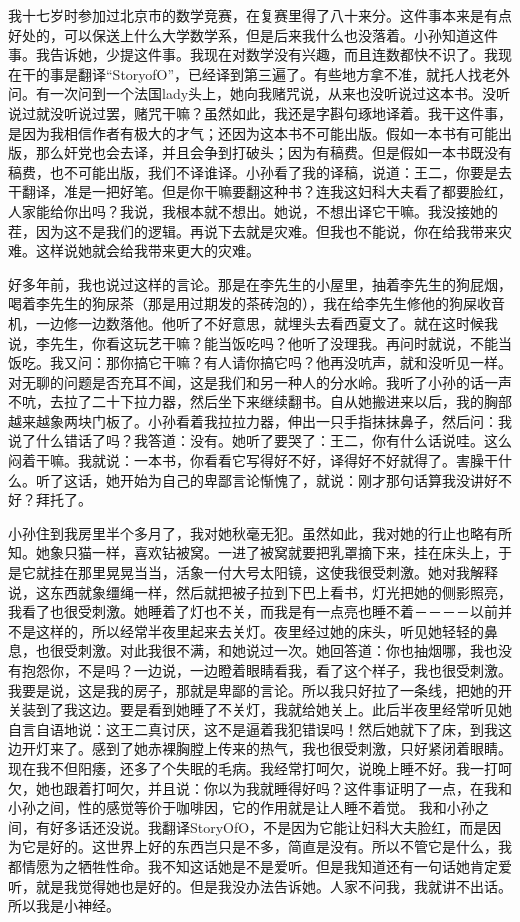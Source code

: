 我十七岁时参加过北京市的数学竞赛，在复赛里得了八十来分。这件事本来是有点好处的，可以保送上什么大学数学系，但是后来我什么也没落着。小孙知道这件事。我告诉她，少提这件事。我现在对数学没有兴趣，而且连数都快不识了。我现在干的事是翻译“StoryofO”，已经译到第三遍了。有些地方拿不准，就托人找老外问。有一次问到一个法国lady头上，她向我赌咒说，从来也没听说过这本书。没听说过就没听说过罢，赌咒干嘛？虽然如此，我还是字斟句琢地译着。我干这件事，是因为我相信作者有极大的才气；还因为这本书不可能出版。假如一本书有可能出版，那么奸党也会去译，并且会争到打破头；因为有稿费。但是假如一本书既没有稿费，也不可能出版，我们不译谁译。小孙看了我的译稿，说道：王二，你要是去干翻译，准是一把好笔。但是你干嘛要翻这种书？连我这妇科大夫看了都要脸红，人家能给你出吗？我说，我根本就不想出。她说，不想出译它干嘛。我没接她的茬，因为这不是我们的逻辑。再说下去就是灾难。但我也不能说，你在给我带来灾难。这样说她就会给我带来更大的灾难。 

好多年前，我也说过这样的言论。那是在李先生的小屋里，抽着李先生的狗屁烟，喝着李先生的狗尿茶（那是用过期发的茶砖泡的），我在给李先生修他的狗屎收音机，一边修一边数落他。他听了不好意思，就埋头去看西夏文了。就在这时候我说，李先生，你看这玩艺干嘛？能当饭吃吗？他听了没理我。再问时就说，不能当饭吃。我又问：那你搞它干嘛？有人请你搞它吗？他再没吭声，就和没听见一样。对无聊的问题是否充耳不闻，这是我们和另一种人的分水岭。我听了小孙的话一声不吭，去拉了二十下拉力器，然后坐下来继续翻书。自从她搬进来以后，我的胸部越来越象两块门板了。小孙看着我拉拉力器，伸出一只手指抹抹鼻子，然后问：我说了什么错话了吗？我答道：没有。她听了要哭了：王二，你有什么话说哇。这么闷着干嘛。我就说：一本书，你看看它写得好不好，译得好不好就得了。害臊干什么。听了这话，她开始为自己的卑鄙言论惭愧了，就说：刚才那句话算我没讲好不好？拜托了。 

小孙住到我房里半个多月了，我对她秋毫无犯。虽然如此，我对她的行止也略有所知。她象只猫一样，喜欢钻被窝。一进了被窝就要把乳罩摘下来，挂在床头上，于是它就挂在那里晃晃当当，活象一付大号太阳镜，这使我很受刺激。她对我解释说，这东西就象缰绳一样，然后就把被子拉到下巴上看书，灯光把她的侧影照亮，我看了也很受刺激。她睡着了灯也不关，而我是有一点亮也睡不着－－－－以前并不是这样的，所以经常半夜里起来去关灯。夜里经过她的床头，听见她轻轻的鼻息，也很受刺激。对此我很不满，和她说过一次。她回答道：你也抽烟哪，我也没有抱怨你，不是吗？一边说，一边瞪着眼睛看我，看了这个样子，我也很受刺激。我要是说，这是我的房子，那就是卑鄙的言论。所以我只好拉了一条线，把她的开关装到了我这边。要是看到她睡了不关灯，我就给她关上。此后半夜里经常听见她自言自语地说：这王二真讨厌，这不是逼着我犯错误吗！然后她就下了床，到我这边开灯来了。感到了她赤裸胸膛上传来的热气，我也很受刺激，只好紧闭着眼睛。现在我不但阳痿，还多了个失眠的毛病。我经常打呵欠，说晚上睡不好。我一打呵欠，她也跟着打呵欠，并且说：你以为我就睡得好吗？这件事证明了一点，在我和小孙之间，性的感觉等价于咖啡因，它的作用就是让人睡不着觉。 我和小孙之间，有好多话还没说。我翻译StoryOfO，不是因为它能让妇科大夫脸红，而是因为它是好的。这世界上好的东西岂只是不多，简直是没有。所以不管它是什么，我都情愿为之牺牲性命。我不知这话她是不是爱听。但是我知道还有一句话她肯定爱听，就是我觉得她也是好的。但是我没办法告诉她。人家不问我，我就讲不出话。所以我是小神经。

